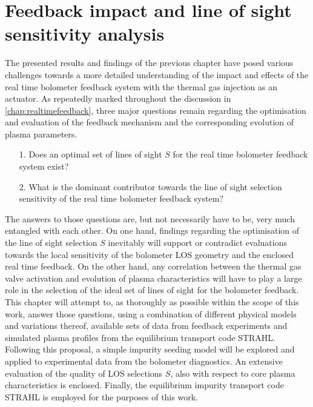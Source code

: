 %
\chapter{Feedback impact and line of sight sensitivity analysis}\label{chap:feedbackeval}%
%
    The presented results and findings of the previous chapter have posed various challenges towards a more detailed understanding of the impact and effects of the real time bolometer feedback system with the thermal gas injection as an actuator. As repeatedly marked throughout the discussion in \cref{chap:realtimefeedback}, three major questions remain regarding the optimisation and evaluation of the feedback mechanism and the corresponding evolution of plasma parameters.%
%
    \begin{enumerate}%
        \item[1.]{%
            Does an optimal set of lines of sight $S$ for the real time bolometer feedback system exist?}%
        \item[2.]{%
            What is the dominant contributor towards the line of sight selection sensitivity of the real time bolometer feedback system?}%
    \end{enumerate}%
%
    The answers to those questions are, but not necessarily have to be, very much entangled with each other. On one hand, findings regarding the optimisation of the line of sight selection $S$ inevitably will support or contradict evaluations towards the local sensitivity of the bolometer LOS geometry and the enclosed real time feedback. On the other hand, any correlation between the thermal gas valve activation and evolution of plasma characteristics will have to play a large role in the selection of the ideal set of lines of sight for the bolometer feedback.\\%
    This chapter will attempt to, as thoroughly as possible within the scope of this work, answer those questions, using a combination of different physical models and variations thereof, available sets of data from feedback experiments and simulated plasma profiles from the equilibrium transport code STRAHL. Following this proposal, a simple impurity seeding model will be explored and applied to experimental data from the bolometer diagnostics. An extensive evaluation of the quality of LOS selections $S$, also with respect to core plasma characteristics is enclosed. Finally, the equilibrium impurity transport code STRAHL is employed for the purposes of this work.%
%
